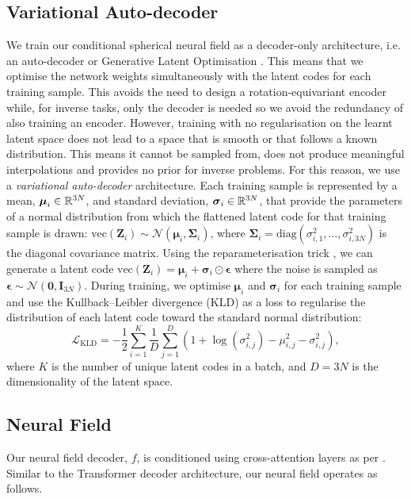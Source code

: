 \subsection{Variational Auto-decoder}
We train our conditional spherical neural field as a decoder-only architecture, i.e. an auto-decoder \cite{park_deepsdf_2019} or Generative Latent Optimisation \cite{bojanowskiOptimizingLatentSpace2018}. This means that we optimise the network weights simultaneously with the latent codes for each training sample. This avoids the need to design a rotation-equivariant encoder while, for inverse tasks, only the decoder is needed so we avoid the redundancy of also training an encoder. However, training with no regularisation on the learnt latent space does not lead to a space that is smooth or that follows a known distribution. This means it cannot be sampled from, does not produce meaningful interpolations and provides no prior for inverse problems. For this reason, we use a \emph{variational auto-decoder} \cite{zadeh_variational_2021} architecture. Each training sample is represented by a mean, $\boldsymbol{\mu}_{i}\in{\mathbb{R}}^{3N}$, and standard deviation, $\boldsymbol{\sigma}_{i}\in{\mathbb{R}}^{3N}$, that provide the parameters of a normal distribution from which the flattened latent code for that training sample is drawn: $\text{vec}(\mathbf{Z}_i)\sim\mathcal{N}(\boldsymbol{\mu}_{i},\boldsymbol{\Sigma}_i)$, where $\boldsymbol{\Sigma}_i=\text{diag}(\sigma_{i,1}^2,\dots,\sigma_{i,3N}^2)$ is the diagonal covariance matrix. Using the reparameterisation trick \cite{kingma_auto-encoding_2013}, we can generate a latent code \(\text{vec}(\mathbf{Z}_{i}) = \boldsymbol{\mu}_{i}+ \boldsymbol{\sigma}_{i} \odot \boldsymbol{\epsilon}\) where the noise is sampled as \(\boldsymbol{\epsilon} \sim \mathcal{N}(\mathbf{0}, \mathbf{I}_{3N})\). During training, we optimise $\boldsymbol{\mu}_{i}$ and  $\boldsymbol{\sigma}_{i}$ for each training sample and use the Kullback–Leibler divergence (KLD) as a loss to regularise the distribution of each latent code toward the standard normal distribution:
\begin{equation}\label{kld_loss}
    \mathcal{L}_{\text{KLD}}= -\frac{1}{2}\sum_{i=1}^{K}\frac{1}{D}\sum_{j=1}^{D}(1 + \log(\sigma_{i,j}^{2})-\mu_{i,j}^{2} - \sigma_{i,j}^{2}),
\end{equation}
where $K$ is the number of unique latent codes in a batch, and $D = 3N$ is the dimensionality of the latent space.

\subsection{Neural Field} 
Our neural field decoder, $f$, is conditioned using cross-attention layers as per \cite{rebainAttentionBeatsConcatenation2023}. Similar to the Transformer decoder \cite{vaswaniAttentionAllYou2017} architecture, our neural field operates as follows.

